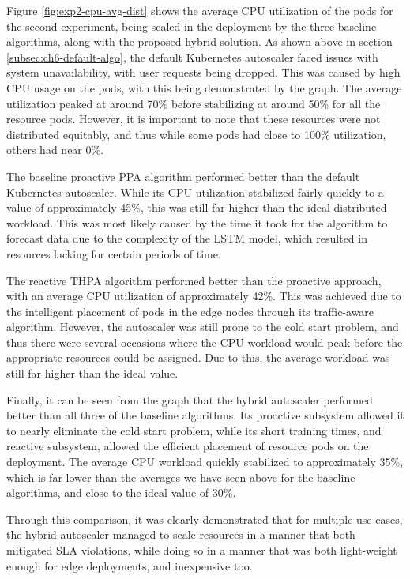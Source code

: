 Figure \ref{fig:exp2-cpu-avg-dist} shows the average CPU utilization of the pods for the second experiment, being scaled in the deployment by the three baseline algorithms, along with the proposed hybrid solution. As shown above in section \ref{subsec:ch6-default-algo}, the default Kubernetes autoscaler faced issues with system unavailability, with user requests being dropped. This was caused by high CPU usage on the pods, with this being demonstrated by the graph. The average utilization peaked at around 70\% before stabilizing at around 50\% for all the resource pods. However, it is important to note that these resources were not distributed equitably, and thus while some pods had close to 100\% utilization, others had near 0\%.\par

The baseline proactive PPA algorithm performed better than the default Kubernetes autoscaler. While its CPU utilization stabilized fairly quickly to a value of approximately 45\%, this was still far higher than the ideal distributed workload. This was most likely caused by the time it took for the algorithm to forecast data due to the complexity of the LSTM model, which resulted in resources lacking for certain periods of time.\par

The reactive THPA algorithm performed better than the proactive approach, with an average CPU utilization of approximately 42\%. This was achieved due to the intelligent placement of pods in the edge nodes through its traffic-aware algorithm. However, the autoscaler was still prone to the cold start problem, and thus there were several occasions where the CPU workload would peak before the appropriate resources could be assigned. Due to this, the average workload was still far higher than the ideal value.\par

Finally, it can be seen from the graph that the hybrid autoscaler performed better than all three of the baseline algorithms. Its proactive subsystem allowed it to nearly eliminate the cold start problem, while its short training times, and reactive subsystem, allowed the efficient placement of resource pods on the deployment. The average CPU workload quickly stabilized to approximately 35\%, which is far lower than the averages we have seen above for the baseline algorithms, and close to the ideal value of 30\%.\par

Through this comparison, it was clearly demonstrated that for multiple use cases, the hybrid autoscaler managed to scale resources in a manner that both mitigated SLA violations, while doing so in a manner that was both light-weight enough for edge deployments, and inexpensive too.\par

